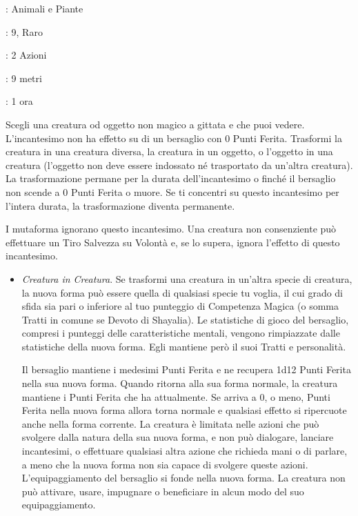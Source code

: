 \begin{multicols}{2}
\noindent\colorbox{OBSSgold!10}{
\begin{minipage}{0.95\linewidth}
\begin{description}[noitemsep, topsep=0pt, parsep=0pt, partopsep=0pt, leftmargin=0cm, labelwidth=1.3cm]
	\item[\textbf{Lista}]: Animali e Piante
	\item[\textbf{Livello}]: 9, Raro
	\item[\textbf{Lancio}]: 2 Azioni
	\item[\textbf{Gittata}]: 9 metri
	\item[\textbf{Durata}]: 1 ora
\end{description}
\end{minipage}}\smallskip

Scegli una creatura od oggetto non magico a gittata e che puoi vedere. L'incantesimo non ha effetto su di un bersaglio con 0 Punti Ferita. Trasformi la creatura in una creatura diversa, la creatura in un oggetto, o l'oggetto in una creatura (l'oggetto non deve essere indossato né trasportato da un'altra creatura). La trasformazione permane per la durata dell'incantesimo o finché il bersaglio non scende a 0 Punti Ferita o muore. Se ti concentri su questo incantesimo per l'intera durata, la trasformazione diventa permanente.

I mutaforma ignorano questo incantesimo. Una creatura non consenziente può effettuare un Tiro Salvezza su Volontà e, se lo supera, ignora l'effetto di questo incantesimo.

\begin{itemize}[leftmargin=*] \setlength{\itemsep}{0pt}
	\item \emph{Creatura in Creatura}. Se trasformi una creatura in un'altra specie di creatura, la nuova forma può essere quella di qualsiasi specie tu voglia, il cui grado di sfida sia pari o inferiore al tuo punteggio di Competenza Magica (o somma Tratti in comune se Devoto di Shayalia). Le statistiche di gioco del bersaglio, compresi i punteggi delle caratteristiche mentali, vengono rimpiazzate dalle statistiche della nuova forma. Egli mantiene però il suoi Tratti e personalità.

	Il bersaglio mantiene i medesimi Punti Ferita e ne recupera 1d12 Punti Ferita nella sua nuova forma. Quando ritorna alla sua forma normale, la creatura mantiene i Punti Ferita che ha attualmente. Se arriva a 0, o meno, Punti Ferita nella nuova forma allora torna normale e qualsiasi effetto si ripercuote anche nella forma corrente. La creatura è limitata nelle azioni che può svolgere dalla natura della sua nuova forma, e non può dialogare, lanciare incantesimi, o effettuare qualsiasi altra azione che richieda mani o di parlare, a meno che la nuova forma non sia capace di svolgere queste azioni. L'equipaggiamento del bersaglio si fonde nella nuova forma. La creatura non può attivare, usare, impugnare o beneficiare in alcun modo del suo equipaggiamento.


\end{itemize}
\end{multicols}
